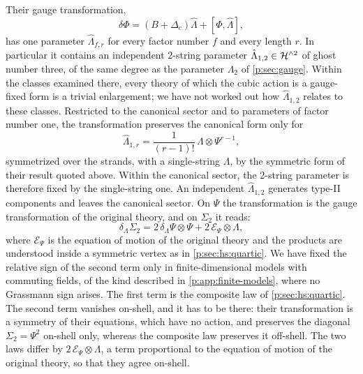 Their gauge transformation,
\begin{equation}
  \label{p:eq:barcobar:gauge}
  \delta \Phi
    = (B + \Delta_c) \hat\Lambda + [\Phi, \hat\Lambda],
\end{equation}
has one parameter $\hat\Lambda_{f, r}$ for every factor number $f$ and every length $r$.
In particular it contains an independent $2$-string parameter $\hat\Lambda_{1, 2} \in \mathcal{H}^{\wedge 2}$ of ghost number three, of the same degree as the parameter $\Lambda_2$ of \cref{p:sec:gauge}.
  Within the classes examined there, every theory of which the cubic action is a gauge-fixed form is a trivial enlargement; we have not worked out how $\hat\Lambda_{1, 2}$ relates to these classes.
Restricted to the canonical sector and to parameters of factor number one, the transformation preserves the canonical form only for
\begin{equation}
  \label{p:eq:barcobar:canonical-parameters}
  \hat\Lambda_{1, r}
    = \frac{1}{(r - 1)!} \, \Lambda \otimes \Psi^{r - 1},
\end{equation}
symmetrized over the strands, with a single-string $\Lambda$, by the symmetric form of their result quoted above.
Within the canonical sector, the $2$-string parameter is therefore fixed by the single-string one.
An independent $\hat\Lambda_{1, 2}$ generates type-II components and leaves the canonical sector.
On $\Psi$ the transformation is the gauge transformation of the original theory, and on $\Sigma_2$ it reads:
\begin{equation}
  \label{p:eq:barcobar:gauge-sigma}
  \delta_\Lambda \Sigma_2
    = 2 \, \delta_\Lambda \Psi \otimes \Psi
      + 2 \, \mathcal E_\Psi \otimes \Lambda,
\end{equation}
where $\mathcal E_\Psi$ is the equation of motion of the original theory and the products are understood inside a symmetric vertex as in \cref{p:sec:hs:quartic}.
We have fixed the relative sign of the second term only in finite-dimensional models with commuting fields, of the kind described in \cref{p:app:finite-models}, where no Grassmann sign arises.
The first term is the composite law of \cref{p:sec:hs:quartic}.
The second term vanishes on-shell, and it has to be there: their transformation is a symmetry of their equations, which have no action, and preserves the diagonal $\Sigma_2 = \Psi^2$ on-shell only, whereas the composite law preserves it off-shell.
  The two laws differ by $2 \, \mathcal E_\Psi \otimes \Lambda$, a term proportional to the equation of motion of the original theory, so that they agree on-shell.

